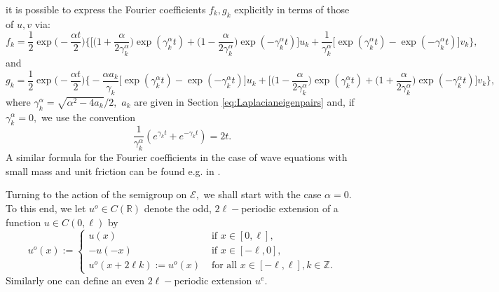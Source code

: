 \documentclass[10pt, reqno]{amsart}
\newcommand{\R}{\mathbb{R}}
\newcommand{\e}{\mathcal{E}}
\theoremstyle{definition}
\numberwithin{lem}{section}
\numberwithin{cor}{section}
\numberwithin{prop}{section}
\numberwithin{thm}{section}
\numberwithin{dfn}{section}
\begin{document}
it is possible to express the Fourier coefficients $f_k, g_k$ explicitly in terms of those of $u,v$ via:
 \begin{equation*}
    f_k=\frac{1}{2}\exp\bigg(-\frac{\alpha t}{2}\bigg)\bigg\{\bigg[\bigg(1+\frac{\alpha}{2\gamma^\alpha_k}\bigg)\exp(\gamma_k^\alpha t)+ \bigg(1-\frac{\alpha}{2\gamma^\alpha_k}\bigg)\exp(-\gamma_k^\alpha t)    \bigg]u_k+\frac{1}{\gamma_k^\alpha}\bigg[ \exp(\gamma_k^\alpha t)-\exp(-\gamma_k^\alpha t)      \bigg]v_k\bigg\},
 \end{equation*}
 and 
 \begin{equation*}
    g_k=\frac{1}{2}\exp\bigg(-\frac{\alpha t}{2}\bigg)\bigg\{-\frac{\alpha a_k}{\gamma_k}\bigg[ \exp(\gamma_k^\alpha t)-\exp(-\gamma_k^\alpha t)      \bigg]u_k+ \bigg[\bigg(1-\frac{\alpha}{2\gamma^\alpha_k}\bigg)\exp(\gamma_k^\alpha t)+ \bigg(1+\frac{\alpha}{2\gamma^\alpha_k}\bigg)\exp(-\gamma_k^\alpha t)    \bigg]    v_k           \bigg\},
 \end{equation*}
 where $\gamma_k^\alpha=\sqrt{\alpha^2-4a_k}/2,$  $a_k$ are given in Section \ref{eq:Laplacianeigenpairs} and, if $\gamma^\alpha_k=0,$ we use the convention $$\frac{1}{\gamma^\alpha_k}(e^{\gamma_k t}+e^{-\gamma_k t})=2t.  $$  A similar formula for the Fourier coefficients in the case of wave equations with small mass and unit friction can be found e.g. in \cite[Proposition 2.2]{cerrai2006PTRFsmoluchowski1}.

 Turning to the action of the semigroup on $\e,$ we shall start with the case $\alpha=0.$ To this end, we let $u^o\in C(\R)$ denote the odd, $2\ell-$periodic extension of a function $u\in C(0,\ell)$ by \begin{equation*}
	u^o(x) := \begin{cases}
		u(x) & \text{ if } x \in [0,\ell],\\
		-u(-x) & \text{ if } x \in [-\ell,0],\\
		u^o(x + 2\ell k ) := u^o(x) & \text { for all  }  x \in [-\ell,\ell], k \in \mathbb{Z}.
	\end{cases}
\end{equation*}
Similarly one can define an even $2\ell-$periodic extension $u^e.$ 
 
 
 
 
 
\end{document}
